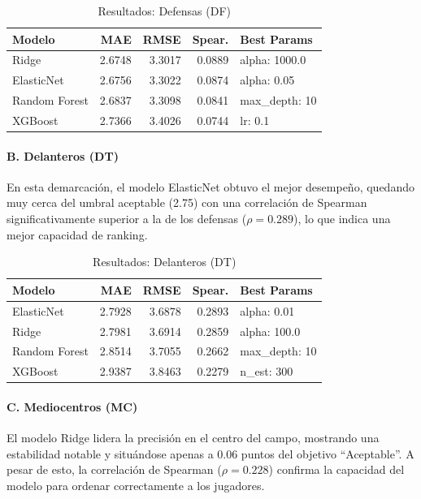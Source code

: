 \begin{table}[H]
\centering
\small
\begin{tabular}{|l|r|r|r|p{3cm}|}
\hline
\textbf{Modelo} & \textbf{MAE} & \textbf{RMSE} & \textbf{Spear.} & 
\textbf{Best Params} \\
\hline
Ridge & 2.6748 & 3.3017 & 0.0889 & alpha:
1000.0 \\
ElasticNet & 2.6756 & 3.3022 & 0.0874 & alpha: 0.05 \\
Random Forest & 2.6837 & 3.3098 & 0.0841 & max\_depth: 10 \\
XGBoost & 2.7366 & 3.4026 & 0.0744 & lr: 0.1 \\
\hline
\end{tabular}
\caption{Resultados: Defensas (DF)}
\end{table}


\paragraph{B. Delanteros (DT)}

En esta demarcación, el modelo ElasticNet obtuvo el mejor 
desempeño, quedando muy cerca del umbral aceptable (2.75) con una 
correlación de Spearman significativamente superior a la de los 
defensas ($\rho = 0.289$), lo que indica una mejor capacidad de 
ranking.

\begin{table}[H]
\centering
\small
\begin{tabular}{|l|r|r|r|p{3cm}|}
\hline
\textbf{Modelo} & \textbf{MAE} & \textbf{RMSE} & \textbf{Spear.} & 
\textbf{Best Params} \\
\hline
ElasticNet & 2.7928 & 3.6878 & 0.2893 & alpha: 0.01 \\
Ridge & 2.7981 & 3.6914 & 0.2859 & alpha: 100.0 \\
Random Forest & 2.8514 & 3.7055 & 0.2662 & max\_depth: 10 \\
XGBoost & 2.9387 & 3.8463 & 0.2279 & n\_est: 300 \\
\hline
\end{tabular}
\caption{Resultados: Delanteros (DT)}
\end{table}


\paragraph{C. Mediocentros (MC)}

El modelo Ridge lidera la precisión en el centro del campo, 
mostrando una estabilidad notable y situándose apenas a 0.06 
puntos del objetivo ``Aceptable''. A pesar de esto, la correlación 
de Spearman ($\rho = 0.228$) confirma la capacidad del modelo 
para ordenar correctamente a los jugadores.

